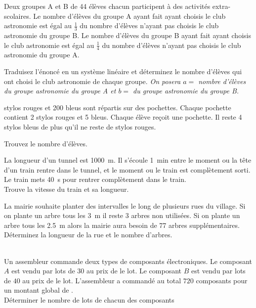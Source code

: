 \documentclass[main.tex]{subfiles}
\begin{document}
\begin{exercise}\hfill  
	
	\noindent Deux groupes A et B de 44 élèves chacun participent à des activités extra-scolaires. Le nombre d'élèves du groupe A ayant fait ayant choisis le club astronomie est égal au $\tfrac{1}{3}$ du nombre d'élèves n'ayant pas choisis le club astronomie du groupe B. Le nombre d'élèves du groupe B ayant fait ayant choisis le club astronomie est égal au $\tfrac{1}{4}$ du nombre d'élèves n'ayant pas choisis le club astronomie du groupe A.
	
	Traduisez l'énoncé en un système linéaire et déterminez le nombre d'élèves qui ont choisi le club astronomie de chaque groupe. 
	\emph{On posera $a=$ nombre d'élèves du groupe astronomie du groupe A et  $b=$ du groupe astronomie du groupe B.}
\end{exercise} 
\begin{exercise}\hfill  
	
	 stylos rouges et 200 bleus sont répartis sur des pochettes. Chaque pochette contient 2 stylos rouges et 5 bleus. Chaque élève reçoit une pochette. Il reste 4 stylos bleus de plus qu'il ne reste de stylos rouges. 
	
	\noindent Trouvez le nombre d'élèves. 
\end{exercise} 
\begin{exercise}\hfill
	
	\noindent La longueur d'un tunnel est \SI{1000}{\meter}. Il s'écoule \SI{1}{\minute} entre le moment ou la tête d'un train rentre dans le tunnel, et le moment ou le train est complètement sorti.  Le train mets \SI{40}{\second} pour rentrer complètement dans le train.\\
	\noindent Trouve la vitesse du train et sa longueur.
\end{exercise} 
\begin{exercise}\hfill 
	
	\noindent La mairie souhaite planter des intervalles le long de plusieurs rues du village. Si on plante un arbre tous les \SI{3}{\meter} il reste 3 arbres non utilisées. Si on plante un arbre tous les \SI{2.5}{\meter} alors la mairie aura besoin de 77 arbres supplémentaires. \\
	\noindent Déterminez la longueur de la rue et le nombre d'arbres.
\end{exercise}  
\begin{exercise}\hfill \\ 
	Un assembleur commande deux types de composants électroniques.  Le composant $A$ est vendu par lots de $30$ au prix de  le lot.  Le composant $B$ est vendu par lots de $40$ au prix de  le lot.   L’assembleur a commandé au total $720$ composants pour un montant global de . \\
	Déterminer le nombre de lots de chacun des composants
\end{exercise}  
\end{document}
